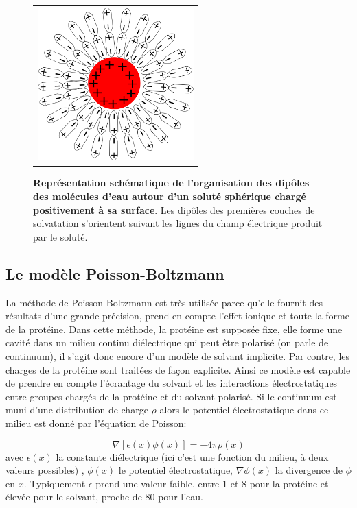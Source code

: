    \begin{figure}[!htbp]
     \centering
     \begin{tabular}{c}
       \includegraphics[width=6cm]{figure/ecrantage.png} &
     \end{tabular}
     
     \caption{\textbf{Représentation schématique de l'organisation des dipôles des molécules d'eau autour d'un soluté sphérique chargé positivement à sa surface}. Les dipôles des premières couches de solvatation s'orientent suivant les lignes du champ électrique produit par le soluté.}
\label{graph:ecrantage}
   \end{figure}
   
\subsection{Le modèle Poisson-Boltzmann}
La méthode de Poisson-Boltzmann est très utilisée parce qu'elle fournit des résultats d'une grande précision, prend en compte l'effet ionique et toute la forme de la protéine. Dans cette méthode, la protéine est supposée fixe, elle forme une cavité dans un milieu continu diélectrique qui peut être polarisé (on parle de continuum), il s'agit donc encore d'un modèle de solvant implicite. Par contre, les charges de la protéine sont traitées de façon explicite. Ainsi ce modèle est capable de prendre en compte l'écrantage du solvant et les interactions électrostatiques entre groupes chargés de la protéine et du solvant polarisé. Si le continuum est muni d'une distribution de charge $\rho$ alors le potentiel électrostatique dans ce milieu est donné par l'équation de Poisson:

\begin{equation}
  \label{eq:poisson}
  \nabla [ \epsilon(x) \phi(x)] = - 4 \pi \rho(x)   
\end{equation}
avec $\epsilon(x)$ la constante diélectrique (ici c'est une fonction du milieu, à deux valeurs possibles) , $\phi (x)$ le potentiel électrostatique, $\nabla \phi(x)$ la divergence de $\phi$ en $x$.
Typiquement $\epsilon$ prend une valeur faible, entre $1$ et $8$ pour la protéine et élevée pour le solvant, proche de $80$ pour l'eau.

